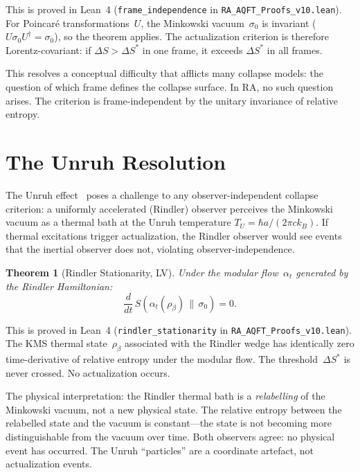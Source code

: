 \documentclass[11pt,a4paper]{article}
\theoremstyle{plain}
\newtheorem{theorem}{Theorem}[section]
\theoremstyle{definition}
\theoremstyle{remark}
\begin{document}
This is proved in Lean~4 (\texttt{frame\_independence} in
\texttt{RA\_AQFT\_Proofs\_v10.lean}).  For Poincar\'e
transformations~$U$, the Minkowski vacuum~$\sigma_0$ is invariant
($U\sigma_0 U^\dagger = \sigma_0$), so the theorem applies.  The
actualization criterion is therefore Lorentz-covariant: if
$\Delta S > \Delta S^*$ in one frame, it exceeds $\Delta S^*$ in all
frames.

This resolves a conceptual difficulty that afflicts many collapse models: the
question of which frame defines the collapse surface.  In RA, no such question
arises.  The criterion is frame-independent by the unitary invariance of relative
entropy.

\section{The Unruh Resolution}\label{sec:unruh}

The Unruh effect~\cite{Unruh1976} poses a challenge to any observer-independent
collapse criterion: a uniformly accelerated (Rindler) observer perceives the
Minkowski vacuum as a thermal bath at the Unruh temperature
$T_U = \hbar a/(2\pi c k_B)$.  If thermal excitations trigger actualization, the
Rindler observer would see events that the inertial observer does not, violating
observer-independence.

\begin{theorem}[Rindler Stationarity, LV]\label{thm:rindler}
Under the modular flow~$\alpha_t$ generated by the Rindler Hamiltonian:
\begin{equation}
\frac{d}{dt}\,S\!\left(\alpha_t(\rho_\beta)\,\|\,\sigma_0\right) = 0.
\label{eq:rindler}
\end{equation}
\end{theorem}

This is proved in Lean~4 (\texttt{rindler\_stationarity} in
\texttt{RA\_AQFT\_Proofs\_v10.lean}).  The KMS thermal state~$\rho_\beta$
associated with the Rindler wedge has identically zero time-derivative of relative
entropy under the modular flow.  The threshold~$\Delta S^*$ is never crossed.  No
actualization occurs.

The physical interpretation: the Rindler thermal bath is a \emph{relabelling} of the
Minkowski vacuum, not a new physical state.  The relative entropy between the
relabelled state and the vacuum is constant---the state is not becoming more
distinguishable from the vacuum over time.  Both observers agree: no physical event
has occurred.  The Unruh ``particles'' are a coordinate artefact, not actualization
events.
\end{document}
